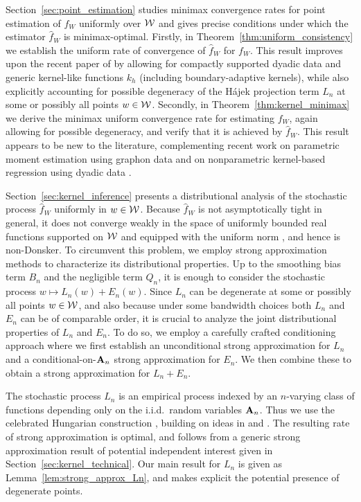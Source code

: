 Section~\ref{sec:point_estimation} studies minimax convergence rates for point
estimation of $f_W$ uniformly over $\mathcal{W}$ and gives precise conditions under
which the estimator $\hat{f}_W$ is minimax-optimal. Firstly, in
Theorem~\ref{thm:uniform_consistency} we establish the uniform rate of
convergence of $\hat{f}_W$ for $f_W$. This result improves upon the recent
paper of \citet{chiang2020empirical} by allowing for compactly supported dyadic
data and generic kernel-like functions $k_h$ (including boundary-adaptive
kernels), while also explicitly accounting for possible degeneracy of the
H\'{a}jek projection term $L_n$ at some or possibly all points $w\in\mathcal{W}$.
Secondly, in Theorem~\ref{thm:kernel_minimax} we derive the minimax uniform
convergence rate for estimating $f_W$, again allowing for possible degeneracy,
and verify that it is achieved by $\hat f_W$. This result appears to be new to
the literature, complementing recent work on parametric moment estimation using
graphon data \citep{gao2021minimax} and on nonparametric kernel-based
regression using dyadic data \citep{graham2021minimax}.

Section~\ref{sec:kernel_inference} presents a distributional analysis of the
stochastic process $\hat{f}_W$ uniformly in $w \in \mathcal{W}$. Because $\hat{f}_W$ is
not asymptotically tight in general, it does not converge weakly in the space
of uniformly bounded real functions supported on $\mathcal{W}$ and equipped with the
uniform norm \citep{van1996weak}, and hence is non-Donsker. To circumvent this
problem, we employ strong approximation methods to characterize its
distributional properties. Up to the smoothing bias term $B_n$ and the
negligible term $Q_n$, it is enough to consider the stochastic process
$w \mapsto L_n(w)+E_n(w)$. Since $L_n$ can be degenerate at some or possibly all
points $w\in\mathcal{W}$, and also because under some bandwidth choices both $L_n$ and
$E_n$ can be of comparable order, it is crucial to analyze the joint
distributional properties of $L_n$ and $E_n$. To do so, we employ a carefully
crafted conditioning approach where we first establish an unconditional strong
approximation for $L_n$ and a conditional-on-$\mathbf{A}_n$ strong approximation for
$E_n$. We then combine these to obtain a strong approximation for $L_n+E_n$.

The stochastic process $L_n$ is an empirical process indexed by an $n$-varying
class of functions depending only on the i.i.d.\ random variables $\mathbf{A}_n$. Thus
we use the celebrated Hungarian construction \citep{komlos1975approximation},
building on ideas in \citet{gine2004kernel} and \citet{gine2010confidence}. The
resulting rate of strong approximation is optimal, and follows from a generic
strong approximation result of potential independent interest given in
Section~\ref{sec:kernel_technical}. Our main result for $L_n$ is given as
Lemma~\ref{lem:strong_approx_Ln}, and makes explicit the potential presence of
degenerate points.

